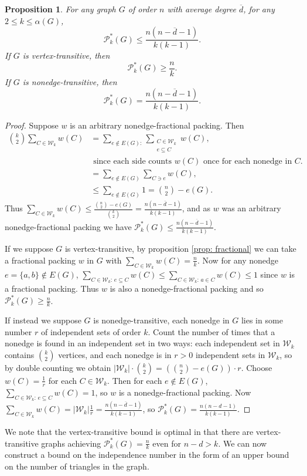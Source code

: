 \documentclass[12pt]{article}
\newtheorem{proposition}[theorem]{Proposition}
\begin{document}
\begin{proposition}
\label{prop: nonedge-fractional}
    For any graph $G$ of order $n$ with average degree $\overline d$, for any $2\leq k\leq\alpha(G)$, $$\mathcal{P}_k^*(G)\le\frac{n(n-\overline d-1)}{k(k-1)}.$$ If $G$ is vertex-transitive, then $$\mathcal{P}_k^*(G)\ge\frac{n}{k}.$$ If $G$ is nonedge-transitive, then $$\mathcal{P}_k^*(G)=\frac{n(n-\overline d-1)}{k(k-1)}.$$
\end{proposition}
\begin{proof}
    Suppose $w$ is an arbitrary nonedge-fractional packing. Then \begin{align*}
        \binom{k}{2}\sum_{C\in\mathcal{W}_k}w(C)&=\sum_{e\not\in E(G):}\sum_{\substack{C\in\mathcal{W}_k\\ e\subseteq C}}w(C),\\
        &\text{ since each side counts $w(C)$ once for each nonedge in $C$.}\\
        &=\sum_{e\not\in E(G)}\sum_{C\ni e}w(C),\\
        &\leq\sum_{e\not\in E(G)}1=\binom{n}{2}-e(G).
    \end{align*}
    Thus $\sum_{C\in\mathcal{W}_k}w(C)\leq\frac{\binom{n}{2}-e(G)}{\binom{k}{2}}=\frac{n(n-\overline d-1)}{k(k-1)}$, and as $w$ was an arbitrary nonedge-fractional packing we have $\mathcal{P}_k^*(G)\le\frac{n(n-\overline d-1)}{k(k-1)}$.

    If we suppose $G$ is vertex-transitive, by proposition \ref{prop: fractional} we can take a fractional packing $w$ in $G$ with $\sum_{C\in\mathcal{W}_k}w(C)=\frac{n}{k}$. Now for any nonedge $e=\{a,b\}\not\in E(G)$, $\sum_{C\in\mathcal{W}_k:\,e\subseteq C}w(C)\leq\sum_{C\in\mathcal{W}_k:\,a\in C}w(C)\leq 1$ since $w$ is a fractional packing. Thus $w$ is also a nonedge-fractional packing and so $\mathcal{P}_k^*(G)\geq\frac{n}{k}$.

    If instead we suppose $G$ is nonedge-transitive, each nonedge in $G$ lies in some number $r$ of independent sets of order $k$. Count the number of times that a nonedge is found in an independent set in two ways: each independent set in $\mathcal{W}_k$ contains $\binom{k}{2}$ vertices, and each nonedge is in $r>0$ independent sets in $\mathcal{W}_k$, so by double counting we obtain $|\mathcal{W}_k|\cdot\binom{k}{2}=\left(\binom{n}{2}-e(G)\right)\cdot r$. Choose $w(C)=\frac{1}{r}$ for each $C\in\mathcal{W}_k$. Then for each $e\not\in E(G)$, $\sum_{C\in\mathcal{W}_k:\,e\subseteq C}w(C)=1$, so $w$ is a nonedge-fractional packing. Now $\sum_{C\in\mathcal{W}_k} w(C)=|\mathcal{W}_k|\frac{1}{r}=\frac{n(n-\overline d-1)}{k(k-1)}$, so $\mathcal{P}_k^*(G)=\frac{n(n-d-1)}{k(k-1)}$.
\end{proof}
We note that the vertex-transitive bound is optimal in that there are vertex-transitive graphs achieving $\mathcal{P}_k^*(G)=\frac{n}{k}$ even for $n-d>k$. We can now construct a bound on the independence number in the form of an upper bound on the number of triangles in the graph.
\end{document}
